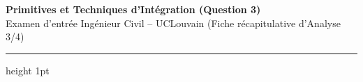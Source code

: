 \newpage
\thispagestyle{plain}

\begin{center}
    {\LARGE\bfseries\color{uclblue} Primitives et Techniques d'Intégration (Question 3)}\\[2pt]
    {\small\color{darkgray} Examen d'entrée Ingénieur Civil -- UCLouvain (Fiche récapitulative d'Analyse 3/4)}
    \vspace{2pt}
    \hrule height 1pt
\end{center}
\vspace{-6pt}

